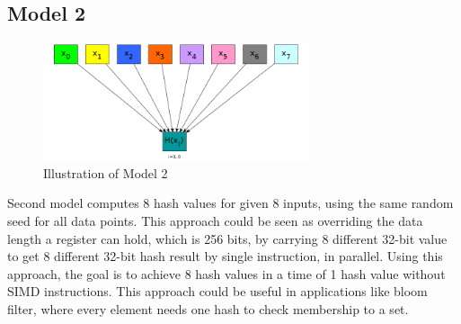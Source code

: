 \documentclass[11pt,oneside,a4paper]{article}
\begin{document}
\subsection{Model 2}
\begin{figure}[H]
\centering
\includegraphics[width=0.7\textwidth]{multi_data_single_hash.png} 
\caption{Illustration of Model 2}
\end{figure}
Second model computes 8 hash values for given 8 inputs, using the same random seed for all data points. This approach could be seen as overriding the data length a register can hold, which is 256 bits, by carrying 8 different 32-bit value to get 8 different 32-bit hash result by single instruction, in parallel. Using this approach, the goal is to achieve 8 hash values in a time of 1 hash value without SIMD instructions. This approach could be useful in applications like bloom filter, where every element needs one hash to check membership to a set.
\end{document}
